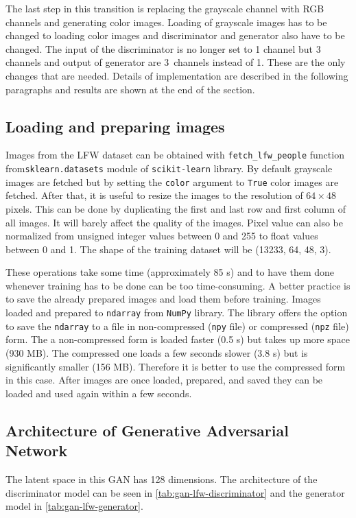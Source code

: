 The last step in this transition is replacing the grayscale channel with RGB channels and generating color images. Loading of grayscale images has to be changed to loading color images and discriminator and generator also have to be changed. The input of the discriminator is no longer set to 1 channel but 3 channels and output of generator are 3~channels instead of 1. These are the only changes that are needed. Details of implementation are described in the following paragraphs and results are shown at the end of the section.

\subsection*{Loading and preparing images}
Images from the LFW dataset can be obtained with \texttt{fetch\_lfw\_people} function from\linebreak\texttt{sklearn.datasets} module of \texttt{scikit-learn} library. By default grayscale images are fetched but by setting the \texttt{color} argument to \texttt{True} color images are fetched. After that, it is useful to resize the images to the resolution of $64\times 48$ pixels. This can be done by duplicating the first and last row and first column of all images. It will barely affect the quality of the images. Pixel value can also be normalized from unsigned integer values between 0 and 255 to float values between 0 and 1. The shape of the training dataset will be (13233, 64, 48, 3).

These operations take some time (approximately 85 s) and to have them done whenever training has to be done can be too time-consuming. A better practice is to save the already prepared images and load them before training. Images loaded and prepared to \texttt{ndarray} from \texttt{NumPy} library. The library offers the option to save the \texttt{ndarray} to a file in non-compressed (\texttt{npy} file) or compressed (\texttt{npz} file) form. The a non-compressed form is loaded faster (0.5 s) but takes up more space (930 MB). The compressed one loads a few seconds slower (3.8 s) but is significantly smaller (156 MB). Therefore it is better to use the compressed form in this case. After images are once loaded, prepared, and saved they can be loaded and used again within a few seconds.

\subsection*{Architecture of Generative Adversarial Network}
The latent space in this GAN has 128 dimensions. The architecture of the discriminator model can be seen in \autoref{tab:gan-lfw-discriminator} and the generator model in \autoref{tab:gan-lfw-generator}.


